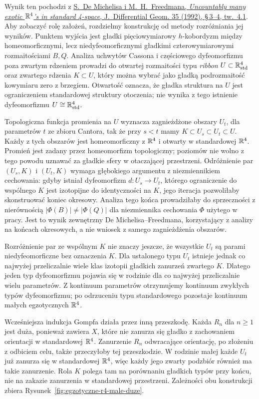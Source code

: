 Wynik ten pochodzi z
\href{https://doi.org/10.4310/jdg/1214447810}
{S.~De Michelisa i M.~H.~Freedmana,
\emph{Uncountably many exotic $\mathbb{R}^4$'s in
standard 4-space}, J.~Differential Geom. 35
(1992), \S\,3--4, tw.~4.1}. Aby zobaczyć rolę
założeń, rozdzielmy konstrukcję od metody
rozróżniania jej wyników. Punktem wyjścia jest
gładki pięciowymiarowy $h$-kobordyzm między
homeomorficznymi, lecz niedyfeomorficznymi
gładkimi czterowymiarowymi rozmaitościami $B,Q$.
Analiza uchwytów Cassona i częściowego
dyfeomorfizmu poza zwartym rdzeniem prowadzi do
otwartej rozmaitości typu \emph{ribbon}
$U\subset\mathbb{R}^4_{\mathrm{std}}$ oraz zwartego
rdzenia $K\subset U$, który można wybrać jako
gładką podrozmaitość kowymiaru zero z brzegiem.
Otwartość oznacza, że gładka
struktura na $U$ jest ograniczeniem standardowej
struktury otoczenia; nie wynika z tego istnienie
dyfeomorfizmu $U\cong\mathbb{R}^4_{\mathrm{std}}$.

Topologiczna funkcja promienia na $U$ wyznacza
zagnieżdżone obszary $U_t$, dla parametrów $t$
ze zbioru Cantora, tak że przy $s<t$ mamy
$K\subset U_s\subset U_t\subset U$.
Każdy z tych obszarów jest homeomorficzny z $\mathbb{R}^4$
i otwarty w standardowej $\mathbb{R}^4$.
Promień jest zadany przez homeomorfizm topologiczny;
poziomów nie wolno z tego powodu uznawać za
gładkie sfery w otaczającej przestrzeni.
Odróżnienie par $(U_s,K)$ i $(U_t,K)$ wymaga
głębokiego argumentu z niezmiennikiem cechowania:
gdyby istniał dyfeomorfizm $d:U_s\to U_t$,
którego ograniczenie do wspólnego $K$ jest
izotopijne do identyczności na $K$, jego iteracja
pozwoliłaby skonstruować koniec okresowy.
Analiza tego końca prowadziłaby do sprzeczności
z nierównością $|\Phi(B)|\ne|\Phi(Q)|$ dla
niezmiennika cechowania $\Phi$ użytego w pracy.
Jest to wynik zewnętrzny
De Michelisa--Freedmana, korzystający z analizy
na końcach okresowych, a nie wniosek z samego
zagnieżdżenia obszarów.

Rozróżnienie par ze wspólnym $K$ nie znaczy jeszcze,
że wszystkie $U_t$ są parami niedyfeomorficzne
bez oznaczenia $K$. Dla ustalonego typu $U_t$
istnieje jednak co najwyżej przeliczalnie wiele
klas izotopii gładkich zanurzeń zwartego $K$.
Dlatego jeden typ dyfeomorfizmu pojawia się
w rodzinie dla co najwyżej przeliczalnie wielu
parametrów. Z kontinuum parametrów otrzymujemy
kontinuum zwykłych typów dyfeomorfizmu;
po odrzuceniu typu standardowego pozostaje
kontinuum małych egzotycznych $\mathbb{R}^4$.

Wcześniejsza indukcja Gompfa działa przez inną
przeszkodę. Każda $R_n$ dla $n\geq1$ jest duża,
ponieważ zawiera $X$, które nie zanurza się
gładko z zachowaniem orientacji w standardowej
$\mathbb{R}^4$. Zanurzenie $R_n$ odwracające orientację,
po złożeniu z odbiciem celu, także przeczyłoby
tej przeszkodzie. W rodzinie małej każde $U_t$
już zanurza się w standardowej $\mathbb{R}^4$,
więc każdy jego zwarty podzbiór również ma takie
zanurzenie. Rola $K$ polega tam na porównaniu
gładkich typów przy końcu, nie na zakazie
zanurzenia w standardowej przestrzeni.
Zależności obu konstrukcji zbiera
Rysunek~\ref{fig:egzotyczne-r4-male-duze}.



